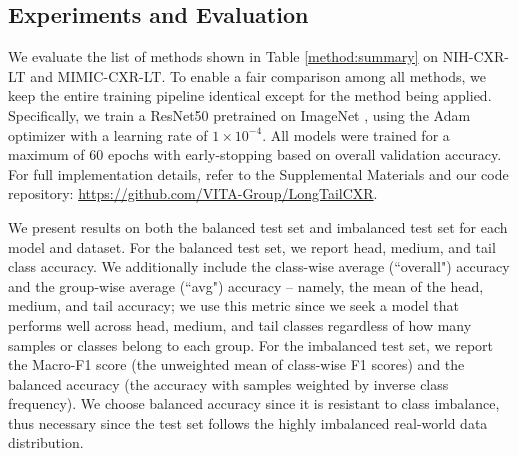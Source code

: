 \documentclass[runningheads]{llncs}
\begin{document}
\subsection{Experiments and Evaluation}
We evaluate the list of methods shown in Table \ref{method:summary} on NIH-CXR-LT and MIMIC-CXR-LT. To enable a fair comparison among all methods, we keep the entire training pipeline identical except for the method being applied. Specifically, we train a ResNet50 \cite{he2016deep} pretrained on ImageNet \cite{deng2009imagenet}, using the Adam optimizer with a learning rate of $1 \times 10^{-4}$. All models were trained for a maximum of 60 epochs with early-stopping based on overall validation accuracy. For full implementation details, refer to the Supplemental Materials and our code repository: \url{https://github.com/VITA-Group/LongTailCXR}.


We present results on both the balanced test set and imbalanced test set for each model and dataset. For the balanced test set, we report head, medium, and tail class accuracy. We additionally include the class-wise average (``overall") accuracy and the group-wise average (``avg") accuracy -- namely, the mean of the head, medium, and tail accuracy; we use this metric since we seek a model that performs well across head, medium, and tail classes regardless of how many samples or classes belong to each group. For the imbalanced test set, we report the Macro-F1 score (the unweighted mean of class-wise F1 scores) and the balanced accuracy (the accuracy with samples weighted by inverse class frequency). We choose balanced accuracy since it is resistant to class imbalance, thus necessary since the test set follows the highly imbalanced real-world data distribution.
\end{document}

